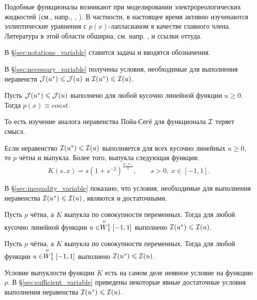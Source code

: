 Подобные функционалы возникают при моделировании электрореологических жидкостей (см., напр., \cite{RuzickaModelingPaper}, \cite{RuzickaModeling}).
В частности, в настоящее время активно изученаются эллиптические уравнения с $p(x)$-лапласианом в качестве главного члена.
Литература в этой области обширна, см. напр. \cite{Ruzicka}, \cite{Zhikov1} и ссылки оттуда.

В \S\ref{sec:notations_variable} ставится задача и вводятся обозначения.

В \S\ref{sec:necessary_variable} получены условия, необходимые для выполнения неравенств
$\mathcal{J}({u^*}) \leqslant \mathcal{J}(u)$ и $\mathcal{I}({u^*}) \leqslant \mathcal{I}(u)$.

\begin{thm}
Пусть $\mathcal{J}({u^*}) \leqslant \mathcal{J}(u)$ выполнено для любой кусочно линейной функции $u \ge 0$.
Тогда $p(x) \equiv const$.
\end{thm}

То есть изучение аналога неравенства Пойа-Сегё для функционала $\mathcal{I}$ теряет смысл.

\begin{thm}
\label{thm:intro_necessary_variable}
Если неравенство $\mathcal{I}({u^*}) \leqslant \mathcal{I}(u)$ выполняется для всех кусочно линейных $u \ge 0$,
то $p$ чётна и выпукла.
Более того, выпукла следующая функция:
$$
K(s, x) = s ( 1 + s^{-2} )^{\frac {p(x)}{2}}, \qquad s > 0,\ x \in [-1, 1].
$$
\end{thm}

В \S\ref{sec:inequality_variable} показано, что условия, необходимые для выполнения неравенства $\mathcal{I}({u^*}) \leqslant \mathcal{I}(u)$,
являются и достаточными.

\begin{lm}
Пусть $p$ чётна, а $K$ выпукла по совокупности переменных.
Тогда для любой кусочно линейной функции $u \in \stackrel{o\ }{W{}_1^1}[-1, 1]$ выполнено $\mathcal{I}({u^*}) \leqslant \mathcal{I}(u)$.
\end{lm}

\begin{thm}
Пусть $p$ чётна, а $K$ выпукла по совокупности переменных.
Тогда для любой функции $u \in \stackrel{o\ }{W{}_1^1}[-1, 1]$ выполнено $\mathcal{I}({u^*}) \leqslant \mathcal{I}(u)$.
\end{thm}

Условие выпуклости функции $K$ есть на самом деле неявное условие на функцию $p$.
В \S\ref{sec:sufficient_variable} приведены некоторые явные достаточные условия выполнения неравенства $\mathcal{I}({u^*}) \leqslant \mathcal{I}(u)$.

